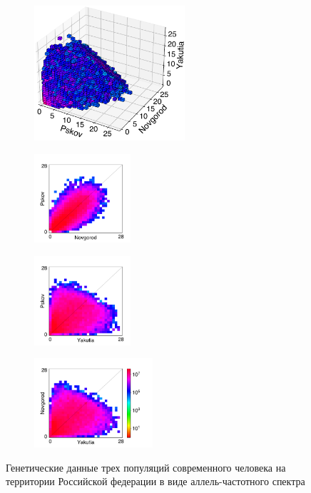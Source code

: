\begin{figure}[ht]
    \centering
    \begin{subfigure}[b]{0.5\linewidth}
        \centering
        \includegraphics[height=5cm]{images_experiments/rus_genomes/3d_plot_Psk_Nov_Yak.pdf}
        \caption{}
        \label{fig:part2:experiments:rus:data_1}
    \end{subfigure}
    \begin{subfigure}[b]{0.33\linewidth}
        \centering
        \includegraphics[height=3.3cm]{images_experiments/rus_genomes/2d_plot_Psk_Nov.pdf}
        \caption{}
        \label{fig:part2:experiments:rus:data_2}
    \end{subfigure}%
    \begin{subfigure}[b]{0.33\linewidth}
        \centering
        \includegraphics[height=3.3cm]{images_experiments/rus_genomes/2d_plot_Psk_Yak.pdf}
        \caption{}
        \label{fig:part2:experiments:rus:data_3}
    \end{subfigure}%
    \begin{subfigure}[b]{0.33\linewidth}
        \centering
        \includegraphics[height=3.3cm]{images_experiments/rus_genomes/2d_plot_Nov_Yak.pdf}
        \caption{}
        \label{fig:part2:experiments:rus:data_4}
    \end{subfigure}
    \caption{Генетические данные трех популяций современного человека на территории Российской федерации в виде аллель-частотного спектра}
    \label{fig:part2:experiments:rus:data}
\end{figure}

